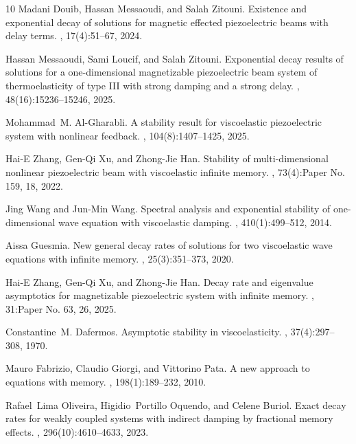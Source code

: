 \documentclass[12pt,reqno]{article}
\begin{document}
\begin{thebibliography}{10}
Madani Douib, Hassan Messaoudi, and Salah Zitouni.
\newblock Existence and exponential decay of solutions for magnetic effected
  piezoelectric beams with delay terms.
, 17(4):51--67, 2024.

Hassan Messaoudi, Sami Loucif, and Salah Zitouni.
\newblock Exponential decay results of solutions for a one-dimensional
  magnetizable piezoelectric beam system of thermoelasticity of type {III} with
  strong damping and a strong delay.
, 48(16):15236--15246, 2025.

Mohammad~M. Al-Gharabli.
\newblock A stability result for viscoelastic piezoelectric system with
  nonlinear feedback.
, 104(8):1407--1425, 2025.

Hai-E Zhang, Gen-Qi Xu, and Zhong-Jie Han.
\newblock Stability of multi-dimensional nonlinear piezoelectric beam with
  viscoelastic infinite memory.
, 73(4):Paper No. 159, 18, 2022.

Jing Wang and Jun-Min Wang.
\newblock Spectral analysis and exponential stability of one-dimensional wave
  equation with viscoelastic damping.
, 410(1):499--512, 2014.

Aissa Guesmia.
\newblock New general decay rates of solutions for two viscoelastic wave
  equations with infinite memory.
, 25(3):351--373, 2020.

Hai-E Zhang, Gen-Qi Xu, and Zhong-Jie Han.
\newblock Decay rate and eigenvalue asymptotics for magnetizable piezoelectric
  system with infinite memory.
, 31:Paper No. 63, 26, 2025.

Constantine~M. Dafermos.
\newblock Asymptotic stability in viscoelasticity.
, 37(4):297--308,
  1970.

Mauro Fabrizio, Claudio Giorgi, and Vittorino Pata.
\newblock A new approach to equations with memory.
, 198(1):189--232, 2010.

Rafael~Lima Oliveira, Higidio~Portillo Oquendo, and Celene Buriol.
\newblock Exact decay rates for weakly coupled systems with indirect damping by
  fractional memory effects.
, 296(10):4610--4633, 2023.


\end{thebibliography}
\end{document}
